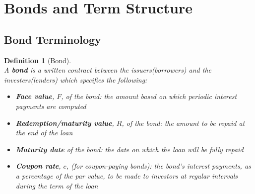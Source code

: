 \documentclass[11pt]{article}
\newtheorem{definition}{Definition}[section]
\theoremstyle{definition}
\begin{document}
\section{Bonds and Term Structure}
\subsection{Bond Terminology}
\begin{definition}[Bond]
\hfill\\\normalfont
A \textbf{bond} is a written contract between the issuers(borrowers) and the investers(lenders) which specifies the following:
\begin{itemize}
  \item \textbf{Face value}, $F$, of the bond: the amount based on which periodic interest payments are computed
  \item \textbf{Redemption/maturity value}, $R$, of the bond: the amount to be repaid at the end of the loan
  \item \textbf{Maturity date} of the bond: the date on which the loan will be fully repaid
  \item \textbf{Coupon rate}, $c$, (for coupon-paying bonds): the bond's interest payments, as a percentage of the par value, to be made to investors at regular intervals during the term of the loan
\end{itemize}
\end{definition}
\end{document}
